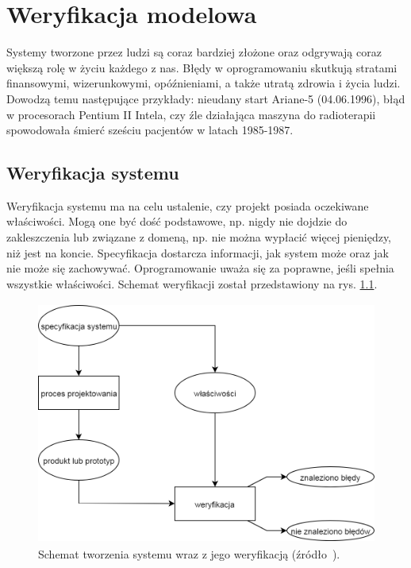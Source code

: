 \chapter{Weryfikacja modelowa}

Systemy tworzone przez ludzi są coraz bardziej złożone oraz odgrywają coraz większą rolę w życiu każdego z nas.
Błędy w oprogramowaniu skutkują stratami finansowymi, wizerunkowymi, opóźnieniami, a także utratą zdrowia i życia ludzi. Dowodzą temu następujące przykłady: nieudany start Ariane-5 (04.06.1996), błąd w procesorach Pentium II Intela, czy źle działająca maszyna do radioterapii spowodowała śmierć sześciu pacjentów w latach 1985-1987.


\section{Weryfikacja systemu}

Weryfikacja systemu ma na celu ustalenie, czy projekt posiada oczekiwane właściwości. Mogą one być dość podstawowe, np. nigdy nie dojdzie do zakleszczenia lub związane z domeną, np. nie można wypłacić więcej pieniędzy, niż jest na koncie. Specyfikacja dostarcza informacji, jak system może oraz jak nie może się zachowywać. Oprogramowanie uważa się za poprawne, jeśli spełnia wszystkie właściwości. Schemat weryfikacji został przedstawiony na rys. \ref{fig:system_verification_scheme}.

\begin{figure}[h]
    \centering
    \includegraphics[height=8cm,keepaspectratio]{img/system_verification_schematic_view.png}
    \caption{Schemat tworzenia systemu wraz z jego weryfikacją (źródło~\cite{Bai08}).}
    \label{fig:system_verification_scheme}
\end{figure}

